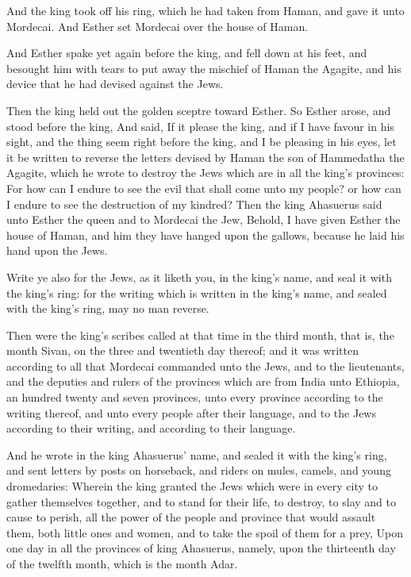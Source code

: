 \verse And the king took off his ring, which he had taken from Haman, and gave it unto Mordecai. And Esther set Mordecai over the house of Haman.

\verse And Esther spake yet again before the king, and fell down at his feet, and besought him with tears to put away the mischief of Haman the Agagite, and his device that he had devised against the Jews.

\verse Then the king held out the golden sceptre toward Esther. So Esther arose, and stood before the king, \verse And said, If it please the king, and if I have favour in his sight, and the thing seem right before the king, and I be pleasing in his eyes, let it be written to reverse the letters devised by Haman the son of Hammedatha the Agagite, which he wrote to destroy the Jews which are in all the king's provinces: \verse For how can I endure to see the evil that shall come unto my people?  or how can I endure to see the destruction of my kindred?  \verse Then the king Ahasuerus said unto Esther the queen and to Mordecai the Jew, Behold, I have given Esther the house of Haman, and him they have hanged upon the gallows, because he laid his hand upon the Jews.

\verse Write ye also for the Jews, as it liketh you, in the king's name, and seal it with the king's ring: for the writing which is written in the king's name, and sealed with the king's ring, may no man reverse.

\verse Then were the king's scribes called at that time in the third month, that is, the month Sivan, on the three and twentieth day thereof; and it was written according to all that Mordecai commanded unto the Jews, and to the lieutenants, and the deputies and rulers of the provinces which are from India unto Ethiopia, an hundred twenty and seven provinces, unto every province according to the writing thereof, and unto every people after their language, and to the Jews according to their writing, and according to their language.

\verse And he wrote in the king Ahasuerus' name, and sealed it with the king's ring, and sent letters by posts on horseback, and riders on mules, camels, and young dromedaries: \verse Wherein the king granted the Jews which were in every city to gather themselves together, and to stand for their life, to destroy, to slay and to cause to perish, all the power of the people and province that would assault them, both little ones and women, and to take the spoil of them for a prey, \verse Upon one day in all the provinces of king Ahasuerus, namely, upon the thirteenth day of the twelfth month, which is the month Adar.

